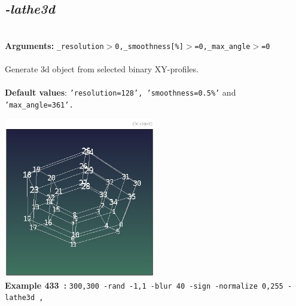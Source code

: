 \documentclass[a4paper,11pt,twoside]{book}
\begin{document}
\subsection{\emph{-lathe3d} }\vspace*{-0.5em}
~\\\textbf{Arguments: } 
{\small \texttt{\_resolution$>$0,\_smoothness[\%]$>$=0,\_max\_angle$>$=0}}\\~\\
Generate 3d object from selected binary XY-profiles.
~\\~\\\textbf{Default values}: {\small \texttt{'resolution=128', 'smoothness=0.5\%'} and \texttt{'max\_angle=361'.}}
\begin{center}\includegraphics[keepaspectratio=true,height=7cm,width=\textwidth]{img/gmic_def433.jpg}\\
{\footnotesize \textbf{Example 433~:} \texttt{300,300 -rand -1,1 -blur 40 -sign -normalize 0,255 -lathe3d ,}}
\end{center}
\end{document}
